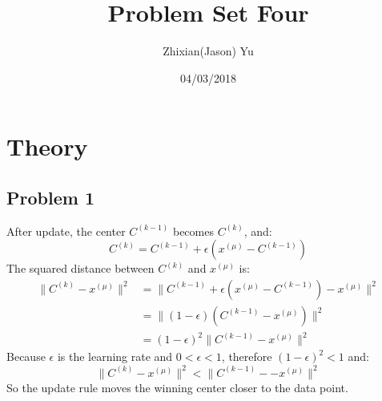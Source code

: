 \documentclass{article}
\title{Problem Set Four}
\date{04/03/2018}
\author{Zhixian(Jason) Yu}
\begin{document}
\maketitle
{}
\newpage

\section{Theory}
\subsection*{Problem 1}
After update, the center $C^{(k-1)}$ becomes $C^{(k)}$, and:
\begin{equation*}
C^{(k)} = C^{(k-1)} + \epsilon(x^{(\mu)} - C^{(k-1)})
\end{equation*}
The squared distance between $C^{(k)}$ and $x^{(\mu)}$ is:
\begin{align*}
\| C^{(k)} - x^{(\mu)} \|^2 &= \|C^{(k-1)} + \epsilon(x^{(\mu)} - C^{(k-1)}) - x^{(\mu)} \|^2 \\
&= \|(1-\epsilon)(C^{(k-1)} -  x^{(\mu)}) \|^2 \\
&= (1- \epsilon)^2 \|C^{(k-1)} - x^{(\mu)} \|^2
\end{align*}
Because $\epsilon$ is the learning rate and $0 < \epsilon < 1$, therefore $(1- \epsilon)^2 < 1$ and:
\begin{equation*}
\| C^{(k)} - x^{(\mu)} \|^2 < \|C^{(k-1)} - - x^{(\mu)} \|^2
\end{equation*}
So the update rule moves the winning center closer to the data point.
\end{document}

